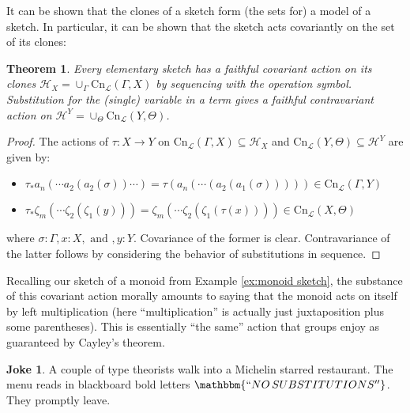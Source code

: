 \documentclass[12pt,twoside]{reedthesis}
\theoremstyle{definition}
\newtheorem{joke}{Joke}
\theoremstyle{remark}
\theoremstyle{plain}
\newtheorem{theorem}{Theorem}
\begin{document}
  It can be shown that the clones of a sketch form (the sets for) a model of a
  sketch. In particular, it can be shown that the sketch acts covariantly on the
  set of its clones:
  \begin{theorem}\label{thm:clone model}
    Every elementary sketch has a faithful covariant action on its clones
    \(\mathcal{H}_{X} = \cup_{\Gamma} \text{Cn}_{\mathcal{L}}(\Gamma,X)\) by sequencing with
    the operation symbol. Substitution for the (single) variable in a term gives
    a faithful contravariant action on
    \(\mathcal{H}^{Y} = \cup_{\Theta} \text{Cn}_{\mathcal{L}}(Y,\Theta)\).
  \end{theorem}
  \begin{proof}
    The actions of \(\tau : X \rightarrow Y\) on
    \(\text{Cn}_\mathcal{L}(\Gamma,X) \subseteq \mathcal{H}_{X}\) and
    \(\text{Cn}_\mathcal{L}(Y,\Theta) \subseteq \mathcal{H}^{Y}\) are given by:
    \begin{itemize}
      \item \(\tau_{*}a_{n}(\cdots a_{2}(a_{2}(\sigma))\cdots) =
      \tau(a_{n}(\cdots(a_{2}(a_{1}(\sigma))))) \in
      \text{Cn}_{\mathcal{L}}(\Gamma,Y)\)
      \item \(\tau_{*}\zeta_{m}(\cdots \zeta_{2}(\zeta_{1}(y))) =
      \zeta_{m}(\cdots\zeta_{2}(\zeta_{1}(\tau(x)))) \in
      \text{Cn}_{\mathcal{L}}(X,\Theta)\)
    \end{itemize}
    where \(\sigma : \Gamma, x : X, \text { and }, y:Y\). Covariance of the
    former is clear. Contravariance of the latter follows by considering the
    behavior of substitutions in sequence.
  \end{proof}

  Recalling our sketch of a monoid from Example \ref{ex:monoid sketch}, the substance of
  this covariant action morally amounts to saying that the monoid acts on itself
  by left multiplication (here ``multiplication'' is actually just juxtaposition
  plus some parentheses). This is essentially ``the same'' action that groups
  enjoy as guaranteed by Cayley's theorem.

  \begin{joke}
    A couple of type theorists walk into a Michelin starred restaurant. The menu
    reads in blackboard bold letters $\mathbbm{``NO\, SUBSTITUTIONS''}$. They promptly leave.
  \end{joke}

\end{document}
